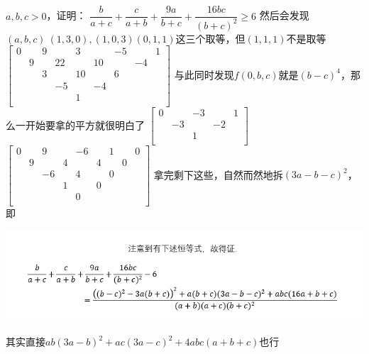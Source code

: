 \documentclass[UTF8]{ctexart}
\begin{document}
\subsection{}$ a,b,c> 0 $，证明：
$ \dfrac{b}{a+c}+\dfrac{c}{a+b}+\dfrac{9a}{b+c}+\dfrac{16bc}{(b+c)^{2}} \geq 6$
然后会发现$ (a,b,c)~(1,3,0),(1,0,3)(0,1,1) $这三个取等，但$ (1,1,1) $不是取等
$ \left[\begin{matrix}
	0& &9& &3& &-5& &1\\
	&9& &22& &10& &-4&\\
	& &3& &10& &6& &\\
	& & &-5& &-4& & &\\
	& & & &1& & & &\\
\end{matrix}\right] $
与此同时发现$ f(0,b,c) $就是$ (b-c)^4 $，那么一开始要拿的平方就很明白了
$ \left[\begin{matrix}
	0& &-3& &1\\
	&-3& &-2&\\
	& &1& &\\
\end{matrix}\right] $
$ \left[\begin{matrix}
	0& &9& &-6& &1& &0\\
	&9& &4& &4& &0&\\
	& &-6& &4& &0& &\\
	& & &1& &0& & &\\
	& & & &0& & & &\\
\end{matrix}\right] $
拿完剩下这些，自然而然地拆$ (3a-b-c)^{2} $，即
\begin{center}
	\includegraphics[width=1\linewidth]{a21}
\end{center}
其实直接$ ab(3a-b)^{2}+ac(3a-c)^{2}+4abc(a+b+c) $也行
\end{document}
